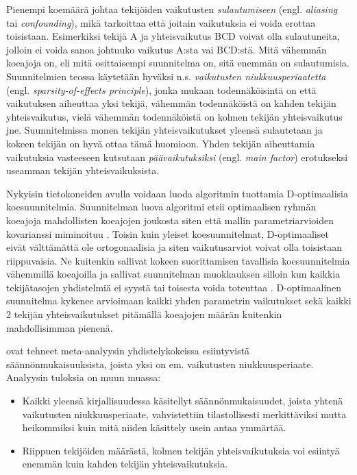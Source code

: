 \documentclass[12pt,a4paper,finnish]{tutthesis}
\begin{document}
Pienempi koemäärä johtaa tekijöiden vaikutusten
\textit{sulautumiseen}
(engl. \textit{aliasing} tai \textit{confounding}), mikä tarkoittaa että joitain
vaikutuksia ei voida erottaa toisistaan. Esimerkiksi tekijä A ja yhteisvaikutus BCD
voivat olla sulautuneita, jolloin ei voida sanoa johtuuko vaikutus A:sta vai
BCD:stä. Mitä vähemmän koeajoja on, eli mitä osittaisempi suunnitelma on, sitä
enemmän on sulautumisia. Suunnitelmien teossa käytetään hyväksi n.s.
\textit{vaikutusten niukkuusperiaatetta} (engl. \textit{sparsity-of-effects principle}),
jonka mukaan todennäköisintä on että vaikutuksen aiheuttaa yksi tekijä, vähemmän
todennäköistä on kahden tekijän yhteisvaikutus, vielä vähemmän todennäköistä on
kolmen tekijän yhteisvaikutus jne.
Suunnitelmissa monen tekijän yhteisvaikutukset
yleensä sulautetaan ja kokeen tekijän on hyvä ottaa tämä huomioon.
Yhden tekijän aiheuttamia vaikutuksia vasteeseen kutsutaan \textit{päävaikutuksiksi}
(engl. \textit{main factor}) erotukseksi useamman tekijän yhteisvaikuksista.

Nykyisin tietokoneiden avulla voidaan luoda algoritmin tuottamia D-optimaalisia
koesuunnitelmia. Suunnitelman luova algoritmi etsii optimaalisen ryhmän
koeajoja mahdollisten koeajojen joukosta siten että mallin parametriarvioiden
kovarianssi miminoituu \parencite[s.~513]{Montgomery2012}.
Toisin kuin yleiset koesuunnitelmat, D-optimaaliset eivät välttämättä ole
ortogonaalisia ja siten vaikutusarviot voivat olla toisistaan riippuvaisia.
Ne kuitenkin sallivat kokeen suorittamisen tavallisia koesuunnitelmia
vähemmillä koeajoilla ja sallivat suunnitelman muokkauksen silloin kun
kaikkia tekijätasojen yhdistelmiä ei syystä tai toisesta voida toteuttaa
\parencite{ehandbook,mitchell1974}.
D-optimaalinen suunnitelma kykenee arvioimaan kaikki yhden parametrin vaikutukset sekä kaikki 2 tekijän yhteisvaikutukset pitämällä koeajojen määrän kuitenkin mahdollisimman pienenä.



\textcite{Li2006} ovat tehneet meta-analyysin yhdistelykokeissa esiintyvistä
säännönmukaisuuksista, joista yksi on em. vaikutusten niukkuusperiaate.
Analyysin tuloksia on muun muassa:

\begin{itemize}
\item Kaikki yleensä kirjallisuudessa käsitellyt säännönmukaisuudet, joista yhtenä
    vaikutusten niukkuusperiaate, vahvistettiin tilastollisesti merkittäviksi mutta
    heikommiksi kuin mitä niiden käsittely usein antaa ymmärtää.
\item Riippuen tekijöiden määrästä, kolmen tekijän yhteisvaikutuksia voi esiintyä
    enemmän kuin kahden tekijän yhteisvaikutuksia.
\end{itemize}
\end{document}
